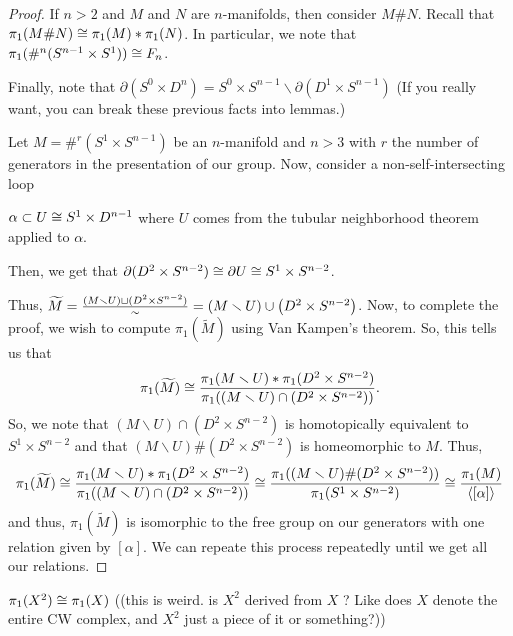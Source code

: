 \documentclass[11pt,leqno,oneside]{amsart}
\numberwithin{thm}{section}
\renewcommand{\setminus}{\smallsetminus}
\renewcommand{\d}{\partial}
\newcommand{\fund}[1][1]{\pi_{#1}}
\newcommand{\x}{\times}
\begin{document}
\begin{proof}
  If $n > 2$ and $M$ and $N$ are $n$-manifolds, then consider $M \#
  N$. Recall that $\fund(M \# N) \isom \fund(M) * \fund(N)$. In
  particular, we note that $\fund(\#^n (S^{n-1} \times S^1)) \isom
  F_n$.


  Finally, note that $\d(S^0 \x D^n) = S^0 \x S^{n-1} \setminus
  \d(D^1 \x S^{n-1})$ (If you really want, you can break these
  previous facts into lemmas.)

  Let $M = \#^r (S^1 \times S^{n-1})$ be an $n$-manifold and $n > 3$
  with $r$ the number of generators in the presentation of our group.
  Now, consider a non-self-intersecting loop

  $\alpha \subset U \isom S^1 \x D^{n-1}$ where $U$ comes from the
  tubular neighborhood theorem applied to $\alpha$.

  Then, we get that $\d(D^2 \x S^{n-2}) \isom \d U \isom S^1 \x
  S^{n-2}$.



  Thus, $\widetilde{M} = \frac{{(M \setminus U) \dunion (D^2 \x S^{n-2})}}{\sim} = \left( M
    \setminus U \right) \union \left( D^2 \times S^{n-2}
  \right)$. Now, to complete the proof, we wish to compute
  $\fund(\tilde{M})$ using Van Kampen's theorem. So, this tells us
  that \[
    \fund(\widetilde{M}) \isom \frac{\fund(M \setminus U) * \fund(D^2
      \times S^{n-2})}{\fund((M \setminus U) \cap (D^2 \times S^{n-2}))}.
  \]
  So, we note that $(M \setminus U) \cap (D^2 \times S^{n-2})$ is
  homotopically equivalent to $S^1 \times S^{n-2}$ and that $(M
  \setminus U) \# (D^2 \times S^{n-2})$ is homeomorphic to
  $M$. Thus, \[
\fund(\widetilde{M}) \isom \frac{\fund(M \setminus U) * \fund(D^2
      \times S^{n-2})}{\fund((M \setminus U) \cap (D^2 \times
      S^{n-2}))} \isom \frac{\fund((M \setminus U) \# (D^2 \times
      S^{n-2}))}{\fund(S^1 \times S^{n-2})} \isom \frac{\fund(M)}{\langle [\alpha] \rangle}
  \]
  and thus, $\fund(\widetilde{M})$ is isomorphic to the free group on
  our generators with one relation given by $[\alpha]$. We can repeate
  this process repeatedly until we get all our relations.
\end{proof}
\begin{thm}
  $\fund(X^2) \isom \fund(X)$ ((this is weird.  is $X^2$ derived from $X$ ?  Like does $X$ denote the entire CW complex, and $X^2$ just a piece of it or something?))
\end{thm}
\end{document}
